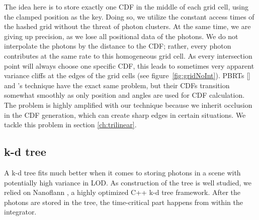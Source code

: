 The idea here is to store exactly one CDF in the middle of each grid cell, using the clamped position as the key. Doing so, we utilize the constant access times of the hashed grid without the threat of photon clusters. At the same time, we are giving up precision, as we lose all positional data of the photons. We do not interpolate the photons by the distance to the CDF; rather, every photon contributes at the same rate to this homogeneous grid cell. As every intersection point will always choose one specific CDF, this leads to sometimes very apparent variance cliffs at the edges of the grid cells (see figure~\ref{fig:gridNoInt}). PBRTs [\citeyear{pbrt}] and \textcite{Vevoda}'s technique have the exact same problem, but their CDFs transition somewhat smoothly as only position and angles are used for CDF calculation. The problem is highly amplified with our technique because we inherit occlusion in the CDF generation, which can create sharp edges in certain situations. We tackle this problem in section \ref{ch:trilinear}.


\subsection{k-d tree}
\label{sec:pneekdtree}

A k-d tree fits much better when it comes to storing photons in a scene with potentially high variance in LOD. As construction of the tree is well studied, we relied on Nanoflann \parencite{blanco2014nanoflann}, a highly optimized C++ k-d tree framework. After the photons are stored in the tree, the time-critical part happens from within the integrator. 

